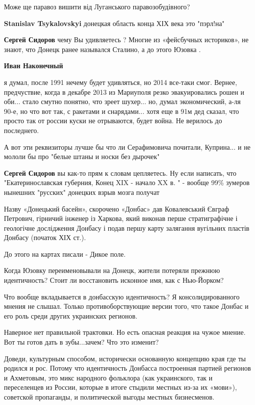 \begin{itemize}
\begin{itemize}
Може ще паравоз вишити від Луганського паравозобудівного?

\textbf{Stanislav Tsykalovskyi} донецкая область конца ХІХ века это "пэрл!на"

\textbf{Сергей Сидоров} чему Вы удивляетесь ? Многие из «фейсбучных историков», не знают, что Донецк ранее назывался Сталино, а до этого Юзовка .

\textbf{Иван Наконечный} 

я думал, после 1991 нечему будет удивляться, но 2014 все-таки смог. Вернее,
предчуствие, когда в декабре 2013 из Мариуполя резко эвакуировались рошен и
оби... стало смутно понятно, что зреет шухер... но, думал экономический, а-ля
90-е, но что вот так, с ракетами и снарядами... хотя еще в 91м дед сказал, что
просто так от россии куски не отрываются, будет война. Не верилось до
последнего.

А вот эти реквизиторы лучше бы что ли Серафимовича почитали, Куприна... и не мололи бы про "белые штаны и носки без дырочек"

\textbf{Сергей Сидоров} вы как-то прям к словам цепляетесь. Ну если написать, что "Екатеринославская губерния, Конец XIX - начало XX в. " - вообще 99\% зумеров нынешних "русских" донецких взрыв мозга получат
\end{itemize} %


Назву «Донецький басейн», скорочено «Донбас» дав Ковалевський Євграф Петрович,
гірничий інженер із Харкова, який виконав перше стратиграфічне і геологічне
дослідження Донбасу і подав першу карту залягання вугільних пластів Донбасу
(початок ХІХ ст.).

До этого на картах писали - Дикое поле.

Когда Юзовку переименовывали на Донецк, жители потеряли прежнюю идентичность?
Стоит ли восстановить исконное имя, как с Нью-Йорком?

Что вообще вкладывается в донбасскую идентичность? Я консолидированного мнения
не слышал. Только противоборствующие версии того, что такое Донбас и его роль
среди других украинских регионов.

Наверное нет правильной трактовки. Но есть опасная реакция на чужое мнение. Вот
ты готов дать в зубы...зачем? Что это изменит?

Доведи, культурным способом, исторически основанную концепцию края где ты
родился и рос. Потому что идентичность Донбасса построенная партией регионов и
Ахметовым, это микс народного фольклора (как украинского, так и переселенцев из
России, которые в итоге стыдили местных из-за их «мови»), советской пропаганды,
и политической выгоды местных бизнесменов.


\end{itemize}

